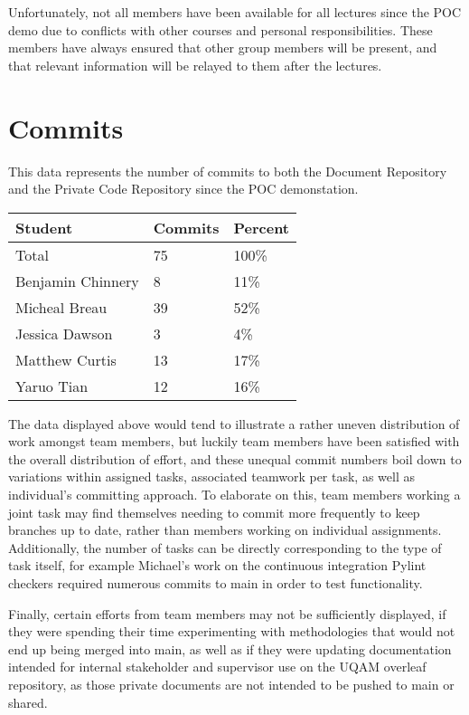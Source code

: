 \documentclass{article}
\begin{document}
Unfortunately, not all members have been available for all lectures since the POC demo due to conflicts with other courses and personal responsibilities. These members have always ensured that other group members will be present, and that relevant information will be relayed to them after the lectures.

\section{Commits}

This data represents the number of commits to both the Document Repository and the Private Code Repository since the POC demonstation. 
\begin{table}[H]
\centering
\begin{tabular}{lll}
\toprule
\textbf{Student} & \textbf{Commits} & \textbf{Percent}\\
\midrule
Total & 75 & 100\% \\
Benjamin Chinnery & 8 & 11\%\\
Micheal Breau & 39 & 52\%\\
Jessica Dawson & 3 & 4\%\\
Matthew Curtis & 13 & 17\%\\
Yaruo Tian & 12 & 16\%\\
\bottomrule
\end{tabular}
\end{table}

The data displayed above would tend to illustrate a rather uneven distribution of work amongst team members, but luckily team members have been satisfied with the overall distribution of effort, and these unequal commit numbers boil down to variations within assigned tasks, associated teamwork per task, as well as individual's committing approach. To elaborate on this, team members working a joint task may find themselves needing to commit more frequently to keep branches up to date, rather than members working on individual assignments. Additionally, the number of tasks can be directly corresponding to the type of task itself, for example Michael's work on the continuous integration Pylint checkers required numerous commits to main in order to test functionality.

Finally, certain efforts from team members may not be sufficiently displayed, if they were spending their time experimenting with methodologies that would not end up being merged into main, as well as if they were updating documentation intended for internal stakeholder and supervisor use on the UQAM overleaf repository, as those private documents are not intended to be pushed to main or shared.
\end{document}
